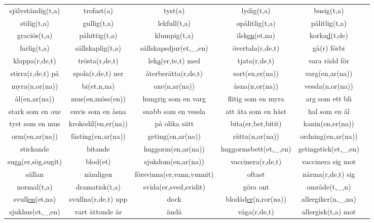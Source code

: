 \begin{center}
    \begin{adjustwidth}{-2.5cm}{}
        \begin{tabular}{|c c c c c c|}
            \hline
            självständig(t,a) & trofast(a) & tyst(a) & lydig(t,a) & busig(t,a) &  \\
            stilig(t,a) & gullig(t,a) & lekfull(t,a) & opålitlig(t,a) & pålitlig(t,a) &  \\
            graciös(t,a) & påhittig(t,a) & klumpig(t,a) & ilsk\underline{en}(et,na) & korka\underline{d}(t,de) &  \\
            farlig(t,a) & sällskaplig(t,a) & sällskapsdjur(et,\_,en) & övertala(r,de,t) & gå(r) förbi &  \\
            klappa(r,de,t) & trösta(r,de,t) & lek\underline{a}(er,te,t) med & tjata(r,de,t) & vara rädd för &  \\
            stirra(r,de,t) på & spola(r,de,t) ner & återberätta(r,de,t) & sort(en,er(na)) & varg(en,ar(na)) &  \\
            myra(n,or(na)) & bi(et,n,na) & oxe(n,ar(na)) & åsna(n,or(na)) & vessla(n,or(na)) &  \\
            ål(en,ar(na)) & mus(en,möss(en)) & hungrig som en varg & flitig som en myra & arg som ett bli &  \\
            stark som en oxe & envis som en åsna & snabb som en vessla & att äta som en häst & hal som en ål &  \\
            tyst som en mus & krokodil(en,er(na)) & på olika sätt & bita(er,bet,bitit) & kanin(en,er(na)) &  \\
            orm(en,ar(na)) & fästing(en,ar(na)) & geting(en,ar(na)) & råtta(n,or(na)) & ordning(en,ar(na)) &  \\
            stickande & bitande & huggorm(en,ar(na)) & huggormsbett(et,\_,en) & getingstick(et,\_,en) &  \\
            sug\underline{a}(er,sög,sugit) & blod(et) & sjukdom(en,ar(na)) & vaccinera(r,de,t) & vaccinera sig mot &  \\
            sällan & nämligen & försvinna(er,vann,vunnit) & oftast & närma(r,de,t) sig &  \\
            normal(t,a) & dramatisk(t,a) & svida(er,sved,svidit) & göra ont & område(t,\_,n) &  \\
            svull\underline{en}(et,na) & svullna(r,de,t) upp & dock & blodåd\underline{er}(n,ror(na)) & allergiker(n,\_,na) &  \\
            sjukhus(et,\_,en) & vart åttonde år & ändå & våga(r,de,t) & allergisk(t,a) mot &  \\

\end{tabular}
\end{adjustwidth}
\end{center}
